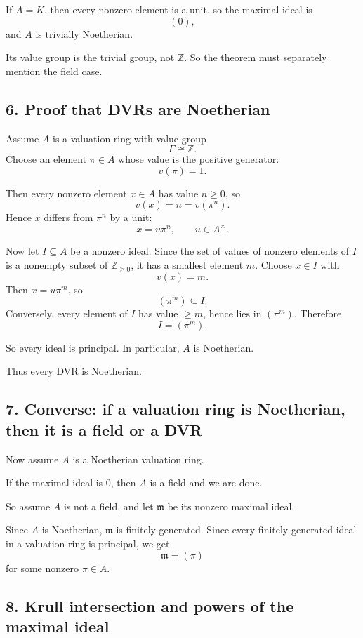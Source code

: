 \documentclass[12pt,a4paper]{article}
\theoremstyle{notespace}
\begin{document}
If \(A=K\), then every nonzero element is a unit, so the maximal ideal is
\[
(0),
\]
and \(A\) is trivially Noetherian.

Its value group is the trivial group, not \(\mathbb Z\). So the theorem must separately mention the field case.

\subsection{6. Proof that DVRs are Noetherian}

Assume \(A\) is a valuation ring with value group
\[
\Gamma\cong \mathbb Z.
\]
Choose an element \(\pi\in A\) whose value is the positive generator:
\[
v(\pi)=1.
\]

Then every nonzero element \(x\in A\) has value \(n\ge 0\), so
\[
v(x)=n=v(\pi^n).
\]
Hence \(x\) differs from \(\pi^n\) by a unit:
\[
x=u\pi^n,
\qquad u\in A^\times.
\]

Now let \(I\subseteq A\) be a nonzero ideal. Since the set of values of nonzero elements of \(I\) is a nonempty subset of \(\mathbb Z_{\ge 0}\), it has a smallest element \(m\). Choose \(x\in I\) with
\[
v(x)=m.
\]
Then \(x=u\pi^m\), so
\[
(\pi^m)\subseteq I.
\]
Conversely, every element of \(I\) has value \(\ge m\), hence lies in \((\pi^m)\). Therefore
\[
I=(\pi^m).
\]

So every ideal is principal. In particular, \(A\) is Noetherian.

Thus every DVR is Noetherian.

\subsection{7. Converse: if a valuation ring is Noetherian, then it is a field or a DVR}

Now assume \(A\) is a Noetherian valuation ring.

If the maximal ideal is \(0\), then \(A\) is a field and we are done.

So assume \(A\) is not a field, and let \(\mathfrak m\) be its nonzero maximal ideal.

Since \(A\) is Noetherian, \(\mathfrak m\) is finitely generated. Since every finitely generated ideal in a valuation ring is principal, we get
\[
\mathfrak m=(\pi)
\]
for some nonzero \(\pi\in A\).

\subsection{8. Krull intersection and powers of the maximal ideal}
\end{document}
